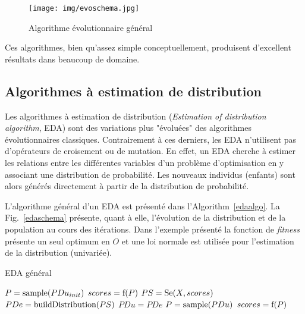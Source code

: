\documentclass[a4paper, 12pt]{report}
\begin{document}
\begin{figure}[!b]
\centering
\texttt{[image: img/evoschema.jpg]}	
\caption{Algorithme évolutionnaire général~\cite{WIKI_EVO}}
\label{evoschema}
\end{figure}

Ces algorithmes, bien qu'assez simple conceptuellement, produisent d'excellent résultats dans beaucoup de domaine.

\newpage
\subsection{Algorithmes à estimation de distribution}
\label{edageneral}
Les algorithmes à estimation de distribution (\textit{Estimation of distribution algorithm}, EDA) sont des variations plus "évoluées" des algorithmes évolutionnaires classiques. Contrairement à ces derniers, les EDA n'utilisent pas d'opérateurs de croisement ou de mutation. En effet, un EDA cherche à estimer les relations entre les différentes variables d'un problème d'optimisation en y associant une distribution de probabilité. Les nouveaux individus (enfants) sont alors générés directement à partir de la distribution de probabilité.

L'algorithme général d'un EDA est présenté dans l'Algorithm~\ref{edaalgo}. La Fig.~\ref{edaschema} présente, quant à elle, l'évolution de la distribution et de la population au cours des itérations. Dans l'exemple présenté la fonction de \textit{fitness} présente un seul optimum en $O$ et une loi normale est utilisée pour l'estimation de la distribution (univariée).

\begin{algorithm}[!tb]                      
\caption{EDA général}          
\label{edaalgo}                           
\begin{algorithmic}                    
\STATE $P = \textnormal{sample}(PDu_{init})$ 
\STATE $scores = \textnormal{f}(P)$ 
\STATE $PS = \textnormal{Se}(X, scores)$ 
\STATE $PDe = \textnormal{buildDistribution}(PS)$ 
\STATE $PDu = PDe$
\STATE $P = \textnormal{sample}(PDu)$ 
\STATE $scores = \textnormal{f}(P)$ 
\ENDWHILE
\end{algorithmic}
\end{algorithm}
\end{document}
